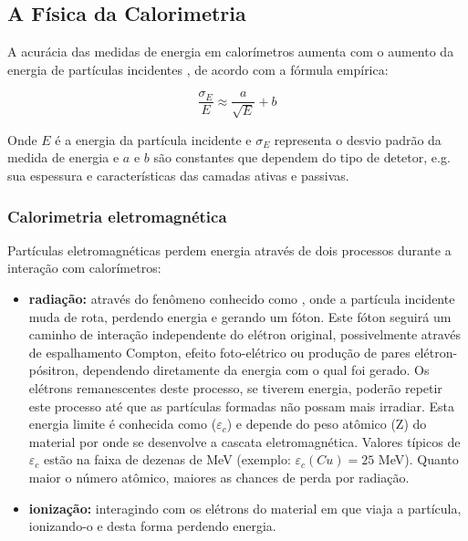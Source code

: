 \subsection{A Física da Calorimetria}

A acurácia das medidas de energia em calorímetros aumenta com o aumento da
energia de partículas incidentes \cite{hadcal}, de acordo com a fórmula
empírica:

\begin{equation}
  \frac{\sigma_{E}}{E} \approx \frac{a}{\sqrt{E}} + b
\end{equation}

Onde $E$ é a energia da partícula incidente e $\sigma_{E}$ representa o desvio
padrão da medida de energia e $a$ e $b$ são constantes que dependem do tipo de
detetor, e.g. sua espessura e características das camadas ativas e passivas.

\subsubsection{Calorimetria eletromagnética}

Partículas eletromagnéticas perdem energia através de dois processos durante a
interação com calorímetros:

\begin{itemize}
\item {\bf radiação:} através do fenômeno conhecido como
  , onde a partícula incidente muda de rota, perdendo
  energia e gerando um fóton. Este fóton seguirá um caminho de interação
  independente do elétron original, possivelmente através de espalhamento
  Compton, efeito foto-elétrico ou produção de pares elétron-pósitron,
  dependendo diretamente da energia com o qual foi gerado. Os elétrons
  remanescentes deste processo, se tiverem energia, poderão repetir este
  processo até que as partículas formadas não possam mais irradiar. Esta
  energia limite é conhecida como  ($\varepsilon_{c}$) e
  depende do peso atômico (Z) do material por onde se desenvolve a cascata
  eletromagnética. Valores típicos de $\varepsilon_{c}$ estão na faixa de
  dezenas de MeV (exemplo: $\varepsilon_{c}(Cu) = 25$ MeV). Quanto maior o
  número atômico, maiores as chances de perda por radiação\cite{knoll, leo}.

\item {\bf ionização:} interagindo com os elétrons do material em que viaja a
  partícula, ionizando-o e desta forma perdendo energia.
\end{itemize}

